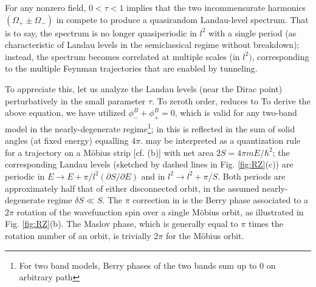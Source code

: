 \documentclass[aps, showpacs, twocolumn, notitlepage, superscriptaddress]{revtex4-1}
\begin{document}
For any nonzero field, $0{<}\tau{<}1$ implies that the two incommensurate harmonics $(\Omega_+{\pm}\Omega_-)$ in  compete to produce a quasirandom Landau-level spectrum\cite{kaganov_coherent_1983}. That is to say, the spectrum is no longer quasiperiodic in $l^2$ with a single period (as characteristic of Landau levels in the semiclassical regime without breakdown\cite{Onsager,lifshitz_kosevich,lifshitz_kosevich_jetp}); instead, the spectrum becomes correlated at multiple scales (in $l^2)$,\cite{kaganov_coherent_1983,slutskin_dynamics_1968,AALG,100p} corresponding to the multiple Feynman trajectories that are enabled by tunneling. 

To appreciate this, let us analyze the Landau levels (near the Dirac point) perturbatively in the small parameter $\tau$. To zeroth order,  reduces to
To derive the above equation, we have utilized $\phi^B_-{+}\phi^B_+{=}0$, which is valid for any two-band model in the nearly-degenerate regime\footnote{For two band models, Berry phases of the two bands sum up to 0 on arbitrary path}; in  this is reflected in the sum of solid angles (at fixed energy) equalling $4\pi$.  may be interpreted as a quantization rule for a trajectory on a M\"obius strip [cf. (b)] with net area $2S{=}4\pi m E{/\hbar^2}$; the corresponding Landau levels (sketched by dashed lines in Fig. \ref{fig:RZ}(c)) are periodic in $E{\rightarrow}E{+}\pi/l^2(\partial S/\partial E)$ and in $l^2{\rightarrow}l^2{+}\pi/S$. Both periods are approximately half that of either disconnected orbit, in the assumed nearly-degenerate regime $\delta S{\ll}S$. The $\pi$ correction in  is the Berry phase associated to a $2\pi$ rotation of the wavefunction spin over a single M\"obius orbit, as illustrated in Fig. \ref{fig:RZ}(b). The Maslov phase, which is generally equal to $\pi$ times the rotation number of an orbit, is trivially $2\pi$ for the M\"obius orbit.
\end{document}
